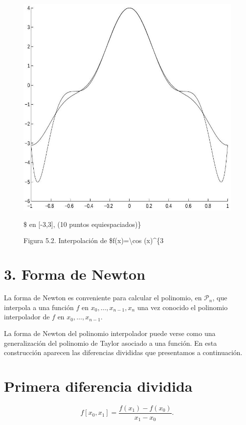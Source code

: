 \documentclass[10pt]{article}
\begin{document}
\begin{figure}[h]
\begin{center}
  \includegraphics[width=\textwidth]{2025_09_05_3888c9ac96bd653d96b4g-098}
\captionsetup{labelformat=empty}
\caption{Figura 5.2. Interpolación de \$f(x)=\textbackslash cos (x)\^{}\{3}\$ en [-3,3], (10 puntos equiespaciados)\}\end{center}
\end{figure}

\section*{3. Forma de Newton}
La forma de Newton es conveniente para calcular el polinomio, en $\mathcal{P}_{n}$, que interpola a una función $f$ en $x_{0}, \ldots, x_{n-1}, x_{n}$ una vez conocido el polinomio interpolador de $f$ en $x_{0}, \ldots, x_{n-1}$.

La forma de Newton del polinomio interpolador puede verse como una generalización del polinomio de Taylor asociado a una función. En esta construcción aparecen las diferencias divididas que presentamos a continuación.

\section*{Primera diferencia dividida}
$$
f\left[x_{0}, x_{1}\right]=\frac{f\left(x_{1}\right)-f\left(x_{0}\right)}{x_{1}-x_{0}} .
$$
\end{document}
